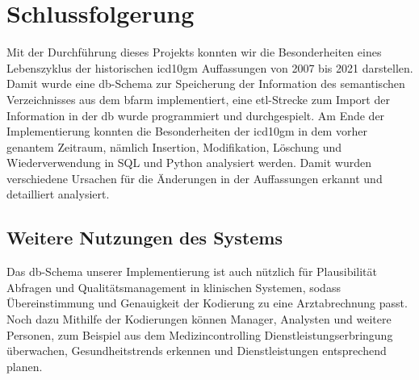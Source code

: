 \chapter{Schlussfolgerung} \label{ch:conclusion}

Mit der Durchführung dieses Projekts konnten wir die Besonderheiten eines Lebenszyklus der historischen \ac{icd10gm} Auffassungen von 2007 bis 2021 darstellen. Damit wurde eine \ac{db}-Schema zur Speicherung der Information des semantischen Verzeichnisses aus dem \ac{bfarm} implementiert, eine \ac{etl}-Strecke zum Import der Information in der \ac{db} wurde programmiert und durchgespielt. Am Ende der Implementierung konnten die Besonderheiten der \ac{icd10gm} in dem vorher genantem Zeitraum, nämlich Insertion, Modifikation, Löschung und Wiederverwendung in SQL und Python analysiert werden. Damit wurden verschiedene Ursachen für die Änderungen in der Auffassungen erkannt und detailliert analysiert.

\section{Weitere Nutzungen des Systems} \label{sec:future}

Das \ac{db}-Schema unserer Implementierung ist auch nützlich für Plausibilität Abfragen und Qualitätsmanagement in klinischen Systemen, sodass Übereinstimmung und Genauigkeit der Kodierung zu eine Arztabrechnung passt. Noch dazu Mithilfe der Kodierungen können Manager, Analysten und weitere Personen, zum Beispiel aus dem Medizincontrolling Dienstleistungserbringung überwachen, Gesundheitstrends erkennen und Dienstleistungen entsprechend planen.
